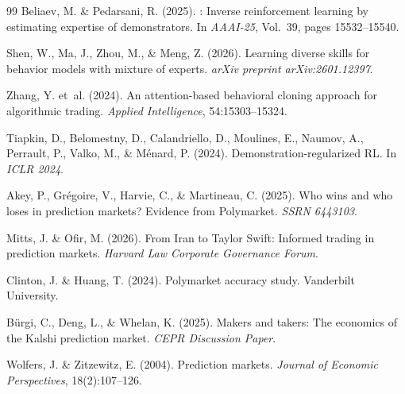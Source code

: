 \documentclass[a4paper, 11pt]{article}
\begin{document}
\begin{thebibliography}{99}
Beliaev, M. \& Pedarsani, R. (2025).
: Inverse reinforcement learning by estimating expertise of demonstrators.
\newblock In \emph{AAAI-25}, Vol.~39, pages 15532--15540.

Shen, W., Ma, J., Zhou, M., \& Meng, Z. (2026).
\newblock Learning diverse skills for behavior models with mixture of experts.
\newblock \emph{arXiv preprint arXiv:2601.12397}.

Zhang, Y. et~al. (2024).
\newblock An attention-based behavioral cloning approach for algorithmic trading.
\newblock \emph{Applied Intelligence}, 54:15303--15324.

Tiapkin, D., Belomestny, D., Calandriello, D., Moulines, E., Naumov, A., Perrault, P., Valko, M., \& M\'enard, P. (2024).
\newblock Demonstration-regularized {RL}.
\newblock In \emph{ICLR 2024}.

Akey, P., Gr\'egoire, V., Harvie, C., \& Martineau, C. (2025).
\newblock Who wins and who loses in prediction markets? Evidence from {Polymarket}.
\newblock \emph{SSRN 6443103}.

Mitts, J. \& Ofir, M. (2026).
\newblock From Iran to Taylor Swift: Informed trading in prediction markets.
\newblock \emph{Harvard Law Corporate Governance Forum}.

Clinton, J. \& Huang, T. (2024).
\newblock Polymarket accuracy study.
\newblock Vanderbilt University.

B\"urgi, C., Deng, L., \& Whelan, K. (2025).
\newblock Makers and takers: The economics of the Kalshi prediction market.
\newblock \emph{CEPR Discussion Paper}.

Wolfers, J. \& Zitzewitz, E. (2004).
\newblock Prediction markets.
\newblock \emph{Journal of Economic Perspectives}, 18(2):107--126.

\end{thebibliography}
\end{document}
